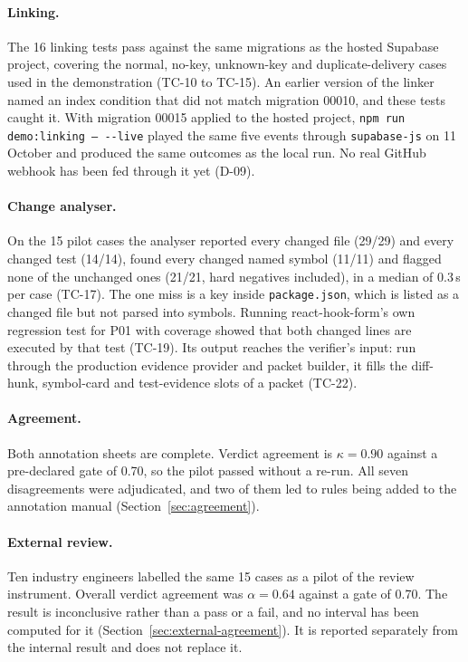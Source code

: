 \paragraph{Linking.} The 16 linking tests pass against the same migrations as
the hosted Supabase project, covering the normal, no-key, unknown-key and
duplicate-delivery cases used in the demonstration (TC-10 to TC-15). An earlier
version of the linker named an index condition that did not match migration
00010, and these tests caught it. With migration 00015 applied to the hosted
project, \texttt{npm run demo:\allowbreak{}linking -- -{}-live} played the same
five events through \texttt{supabase-js} on 11 October and produced the same
outcomes as the local run. No real GitHub webhook has been fed through it yet
(D-09).

\paragraph{Change analyser.} On the 15 pilot cases the analyser reported every
changed file (29/29) and every changed test (14/14), found every changed named
symbol (11/11) and flagged none of the unchanged ones (21/21, hard negatives
included), in a median of 0.3\,s per case (TC-17). The one miss is a key inside
\texttt{package.json}, which is listed as a changed file but not parsed into
symbols. Running react-hook-form's own regression test for P01 with coverage
showed that both changed lines are executed by that test (TC-19). Its output
reaches the verifier's input: run through the production evidence provider and
packet builder, it fills the diff-hunk, symbol-card and test-evidence slots of
a packet (TC-22).

\paragraph{Agreement.} Both annotation sheets are complete. Verdict agreement
is $\kappa = 0.90$ against a pre-declared gate of 0.70, so the pilot passed
without a re-run. All seven disagreements were adjudicated, and two of them led to
rules being added to the annotation manual (Section~\ref{sec:agreement}).

\paragraph{External review.} Ten industry engineers labelled the same 15 cases
as a pilot of the review instrument. Overall verdict agreement was
$\alpha = 0.64$ against a gate of 0.70. The result is inconclusive rather than a
pass or a fail, and no interval has been computed for it
(Section~\ref{sec:external-agreement}). It is reported separately from the
internal result and does not replace it.

